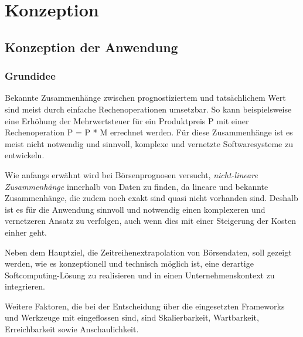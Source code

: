 \chapter{Konzeption}
\label{chapter:Konzeption}

\section{Konzeption der Anwendung} %
\label{section:Konzeption der Anwendung} %

\subsection{Grundidee} %
\label{subsection:Grundidee} %
Bekannte Zusammenhänge zwischen prognostiziertem und tatsächlichem Wert sind meist durch einfache Rechenoperationen umsetzbar. So kann beispielsweise eine Erhöhung der Mehrwertsteuer für ein Produktpreis P mit einer Rechenoperation P = P * M errechnet werden. Für diese Zusammenhänge ist es meist nicht notwendig und sinnvoll, komplexe und vernetzte Softwaresysteme zu entwickeln. 

Wie anfangs erwähnt wird bei Börsenprognosen versucht, \emph{nicht-lineare Zusammenhänge} innerhalb von Daten zu finden, da lineare und bekannte Zusammenhänge, die zudem noch exakt sind quasi nicht vorhanden sind. Deshalb ist es für die Anwendung sinnvoll und notwendig einen komplexeren und vernetzeren Ansatz zu verfolgen, auch wenn dies mit einer Steigerung der Kosten einher geht. 

Neben dem Hauptziel, die Zeitreihenextrapolation von Börsendaten, soll gezeigt werden, wie es konzeptionell und technisch möglich ist, eine derartige Softcomputing-Lösung zu realisieren und in einen Unternehmenskontext zu integrieren.

Weitere Faktoren, die bei der Entscheidung über die eingesetzten Frameworks und Werkzeuge mit eingeflossen sind, sind Skalierbarkeit, Wartbarkeit, Erreichbarkeit sowie Anschaulichkeit. 

